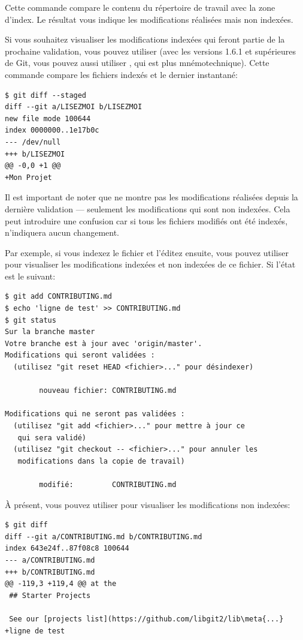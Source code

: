 Cette commande compare le contenu du répertoire de travail avec la zone d'index.
Le résultat vous indique les modifications réalisées mais non indexées.

Si vous souhaitez visualiser les modifications indexées qui feront partie de la prochaine validation, vous pouvez utiliser  (avec les versions 1.6.1 et supérieures de Git, vous pouvez aussi utiliser , qui est plus mnémotechnique).
Cette commande compare les fichiers indexés et le dernier instantané:
\begin{Schunk}
\begin{Verbatim}
$ git diff --staged
diff --git a/LISEZMOI b/LISEZMOI
new file mode 100644
index 0000000..1e17b0c
--- /dev/null
+++ b/LISEZMOI
@@ -0,0 +1 @@
+Mon Projet
\end{Verbatim}
\end{Schunk}

Il est important de noter que  ne montre pas les modifications réalisées depuis la dernière validation --- seulement les modifications qui sont non indexées.
Cela peut introduire une confusion car si tous les fichiers modifiés ont été indexés,  n'indiquera aucun changement.

Par exemple, si vous indexez le fichier  et l'éditez ensuite, vous pouvez utiliser  pour visualiser les modifications indexées et non indexées de ce fichier. Si l'état est le suivant:
\begin{Schunk}
\begin{Verbatim}
$ git add CONTRIBUTING.md
$ echo 'ligne de test' >> CONTRIBUTING.md
$ git status
Sur la branche master
Votre branche est à jour avec 'origin/master'.
Modifications qui seront validées :
  (utilisez "git reset HEAD <fichier>..." pour désindexer)

        nouveau fichier: CONTRIBUTING.md

Modifications qui ne seront pas validées :
  (utilisez "git add <fichier>..." pour mettre à jour ce
   qui sera validé)
  (utilisez "git checkout -- <fichier>..." pour annuler les
   modifications dans la copie de travail)

        modifié:         CONTRIBUTING.md
\end{Verbatim}
\end{Schunk}

À présent, vous pouvez utiliser  pour visualiser les modifications non indexées:
\begin{Schunk}
\begin{Verbatim}[commandchars=\\\{\}]
$ git diff
diff --git a/CONTRIBUTING.md b/CONTRIBUTING.md
index 643e24f..87f08c8 100644
--- a/CONTRIBUTING.md
+++ b/CONTRIBUTING.md
@@ -119,3 +119,4 @@ at the
 ## Starter Projects

 See our [projects list](https://github.com/libgit2/lib\meta{...}
+ligne de test
\end{Verbatim}
\end{Schunk}

